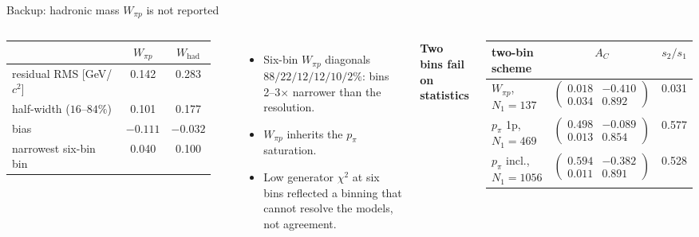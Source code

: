 \documentclass[aspectratio=169,10pt]{beamer}
\begin{document}
\begin{frame}{Backup: hadronic mass $W_{\pi p}$ is not reported}
  \begin{columns}[T]
  \scriptsize\centering\setlength{\tabcolsep}{3pt}
  \begin{tabular}{lcc}
    \toprule
    & $W_{\pi p}$ & $W_\mathrm{had}$ \\\midrule
    residual RMS [GeV/$c^2$] & 0.142 & 0.283 \\
    half-width ($16$--$84\%$) & 0.101 & 0.177 \\
    bias & $-0.111$ & $-0.032$ \\
    narrowest six-bin bin & 0.040 & 0.100 \\
    \bottomrule
  \end{tabular}\\[2mm]
  \raggedright
  \begin{itemize}\setlength\itemsep{1pt}
    \item Six-bin $W_{\pi p}$ diagonals $88/22/12/12/10/2\%$: bins 2--3$\times$ narrower than the resolution.
    \item $W_{\pi p}$ inherits the $p_\pi$ saturation.
    \item Low generator $\chi^2$ at six bins reflected a binning that cannot resolve the models, not agreement.
  \end{itemize}
  \scriptsize
  \textbf{Two bins fail on statistics}
  \begin{center}\setlength{\tabcolsep}{3pt}
  \begin{tabular}{lcc}
    \toprule
    two-bin scheme & $A_C$ & $s_2/s_1$ \\\midrule
    $W_{\pi p}$, $N_1=137$ & $\left(\begin{smallmatrix}0.018&-0.410\\0.034&0.892\end{smallmatrix}\right)$ & 0.031 \\
    $p_\pi$ 1p, $N_1=469$ & $\left(\begin{smallmatrix}0.498&-0.089\\0.013&0.854\end{smallmatrix}\right)$ & 0.577 \\
    $p_\pi$ incl., $N_1=1056$ & $\left(\begin{smallmatrix}0.594&-0.382\\0.011&0.891\end{smallmatrix}\right)$ & 0.528 \\
    \bottomrule
  \end{tabular}

\end{center}
\end{columns}
\end{frame}
\end{document}
